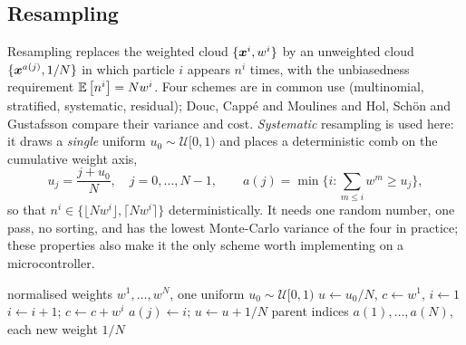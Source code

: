 \subsection{Resampling}
Resampling replaces the weighted cloud $\{\bm{x}^i, w^i\}$ by an unweighted cloud
$\{\bm{x}^{a(j)}, 1/N\}$ in which particle $i$ appears $n^i$ times, with the unbiasedness requirement
$\mathbb{E}\left[n^i\right] = N w^i$.  Four schemes are in common use (multinomial, stratified, systematic,
residual); Douc, Cappé and Moulines \cite{douc2005resampling} and Hol, Schön and Gustafsson
\cite{hol2006resampling} compare their variance and cost.  \emph{Systematic} resampling
\cite[\S3]{kitagawa1996} is used here: it draws a \emph{single} uniform $u_0\sim\mathcal{U}[0,1)$
and places a deterministic comb on the cumulative weight axis,
\begin{equation}
  u_j = \frac{j + u_0}{N}, \quad j = 0,\dots,N-1,
  \qquad
  a(j) = \min\Big\{ i : \textstyle\sum_{m \le i} w^m \ge u_j \Big\},
  \label{eq:pfb-systematic}
\end{equation}
so that $n^i \in \{\lfloor N w^i\rfloor, \lceil N w^i \rceil\}$ deterministically.  It needs one
random number, one pass, no sorting, and has the lowest Monte-Carlo variance of the four in
practice; these properties also make it the only scheme worth implementing on a microcontroller.

\begin{algorithm}[H]
\caption{Systematic resampling (Kitagawa 1996)}
\begin{algorithmic}[1]
\Require normalised weights $w^1,\dots,w^N$, one uniform $u_0 \sim \mathcal{U}[0,1)$
\State $u \gets u_0/N$, \; $c \gets w^1$, \; $i \gets 1$
   \State $i \gets i+1$; \; $c \gets c + w^i$ \EndWhile
  \State $a(j) \gets i$; \quad $u \gets u + 1/N$
\EndFor
\Ensure parent indices $a(1),\dots,a(N)$, each new weight $1/N$
\end{algorithmic}
\end{algorithm}

